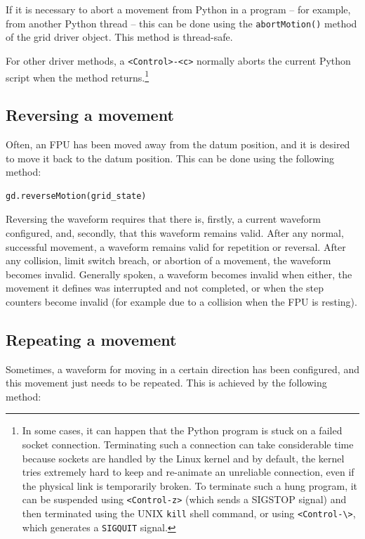 \documentclass[11pt,a4paper]{scrartcl}
\begin{document}
If it is necessary to abort a movement from Python in a program -- for
example, from another Python thread -- this can be done using the
\texttt{abortMotion()} method of the grid driver object.  This method
is thread-safe.

For other driver methods, a \verb+<Control>-<c>+ normally aborts the
current Python script when the method returns.\footnote{
  In some cases, it
  can happen that the Python program is stuck on a failed socket
  connection. Terminating such a connection can take considerable time
  because sockets are handled by the Linux kernel and by default, the
  kernel tries extremely hard to keep and re-animate an unreliable
  connection, even if the physical link is temporarily broken. To
  terminate such a hung program, it can be suspended using
  \texttt{<Control-z>} (which sends a SIGSTOP signal) and then
  terminated using the UNIX \texttt{kill} shell command, or using
  \texttt{<Control-\textbackslash>}, which generates a
  \texttt{SIGQUIT} signal.}


\subsection{Reversing a movement}
Often, an FPU has been moved away from the datum position, and it is
desired to move it back to the datum position.  This can be done using
the following method:

\begin{verbatim}
gd.reverseMotion(grid_state)
\end{verbatim}

Reversing the waveform requires that there is, firstly, a current
waveform configured, and, secondly, that this waveform remains valid.
After any normal, successful movement, a waveform remains valid for
repetition or reversal. After any collision, limit switch breach, or
abortion of a movement, the waveform becomes invalid. Generally
spoken, a waveform becomes invalid when either, the movement it
defines was interrupted and not completed, or when the step counters
become invalid (for example due to a collision when the FPU is
resting).


\subsection{Repeating a movement}
Sometimes, a waveform for moving in a certain direction has been
configured, and this movement just needs to be repeated.  This is
achieved by the following method:
\end{document}
